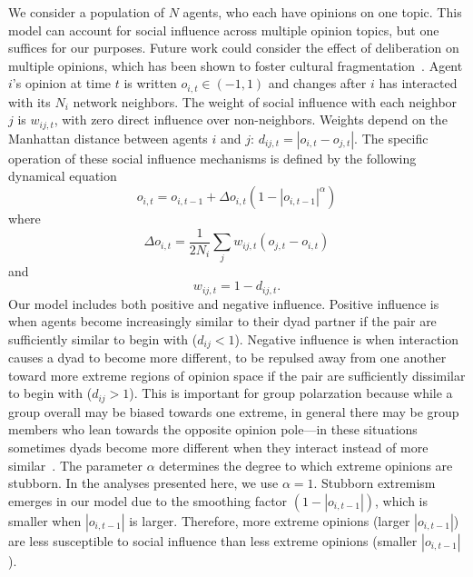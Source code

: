 We consider a population of $N$ agents, who each have opinions
on one topic. This model can account for social influence across multiple
opinion topics, but one suffices for our purposes. Future work could consider
the effect of deliberation on multiple opinions, which has been shown to foster
cultural fragmentation~\cite{DellaPosta2015}. Agent $i$'s opinion at time
$t$ is written $o_{i,t} \in (-1, 1)$ and changes after $i$ has interacted with its
$N_i$ network neighbors. The weight of social influence with each neighbor $j$  is $w_{ij,t}$, 
with zero direct influence over non-neighbors. Weights 
depend on the Manhattan distance between agents $i$ and $j$: $d_{ij,t} = |o_{i,t} - o_{j,t}|$. 
The specific operation of these social influence 
mechanisms is defined by the following dynamical equation
\begin{equation}
  o_{i,t} = o_{i,t-1} + \Delta o_{i,t}(1 - |o_{i,t-1}|^{\alpha})
  \label{eq:basicDynamics}
\end{equation}
\noindent
where
\begin{equation}
  \Delta o_{i,t} = 
    \frac{1}{2N_i} \sum_{j} w_{ij,t} (o_{j,t} - o_{i,t})
\end{equation}
\noindent
and
\begin{equation}
  w_{ij,t} = 1 - d_{ij,t}.
\end{equation}
Our model includes both positive and negative influence. 
Positive influence is when agents become increasingly similar to their dyad partner 
if the pair are sufficiently similar to begin with ($d_{ij} < 1$). Negative influence
is when interaction causes a dyad to become more different, to be
repulsed away from one another toward more extreme regions of opinion space
if the pair are sufficiently dissimilar to begin with ($d_{ij} > 1$). 
This is important for group polarzation because while a group overall may
be biased towards one extreme, in general there may be group members who lean
towards the opposite opinion pole---in these situations sometimes dyads become
more different when they interact instead of more similar~\cite{Bail2018}.
The parameter $\alpha$ determines the degree to which extreme opinions are stubborn. 
In the analyses presented here, we use $\alpha=1$.
Stubborn extremism emerges in our model due to the 
smoothing factor $(1 - |o_{i,t-1}|)$, which is smaller when $|o_{i,t-1}|$ is 
larger. Therefore, more extreme opinions (larger
$|o_{i,t-1}|$) are less susceptible to social influence than less extreme opinions 
(smaller $|o_{i,t-1}|$).

